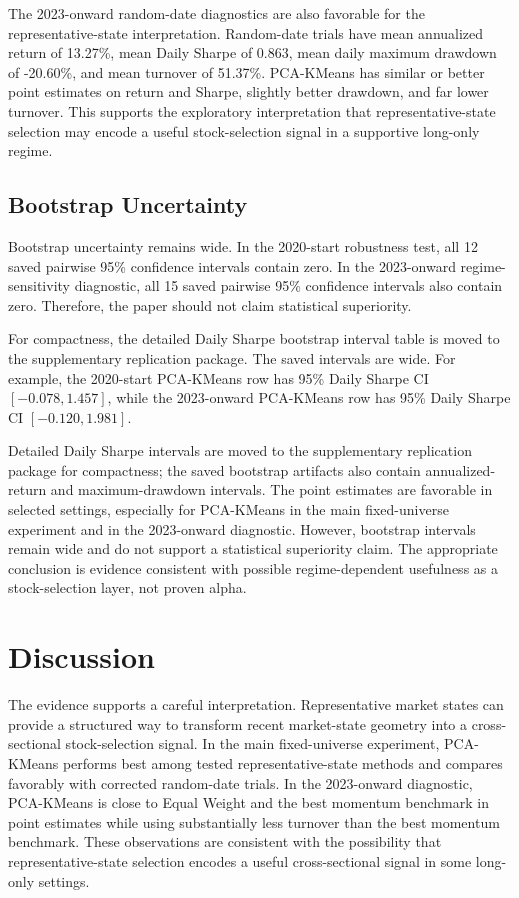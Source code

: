 \documentclass[runningheads]{llncs}
\begin{document}
The 2023-onward random-date diagnostics are also favorable for the representative-state interpretation. Random-date trials have mean annualized return of 13.27\%, mean Daily Sharpe of 0.863, mean daily maximum drawdown of -20.60\%, and mean turnover of 51.37\%. PCA-KMeans has similar or better point estimates on return and Sharpe, slightly better drawdown, and far lower turnover. This supports the exploratory interpretation that representative-state selection may encode a useful stock-selection signal in a supportive long-only regime.

\subsection{Bootstrap Uncertainty}

Bootstrap uncertainty remains wide. In the 2020-start robustness test, all 12 saved pairwise 95\% confidence intervals contain zero. In the 2023-onward regime-sensitivity diagnostic, all 15 saved pairwise 95\% confidence intervals also contain zero. Therefore, the paper should not claim statistical superiority.


For compactness, the detailed Daily Sharpe bootstrap interval table is moved to the supplementary replication package. The saved intervals are wide. For example, the 2020-start PCA-KMeans row has 95\% Daily Sharpe CI $[-0.078,1.457]$, while the 2023-onward PCA-KMeans row has 95\% Daily Sharpe CI $[-0.120,1.981]$.


Detailed Daily Sharpe intervals are moved to the supplementary replication package for compactness; the saved bootstrap artifacts also contain annualized-return and maximum-drawdown intervals. The point estimates are favorable in selected settings, especially for PCA-KMeans in the main fixed-universe experiment and in the 2023-onward diagnostic. However, bootstrap intervals remain wide and do not support a statistical superiority claim. The appropriate conclusion is evidence consistent with possible regime-dependent usefulness as a stock-selection layer, not proven alpha.

\section{Discussion}

The evidence supports a careful interpretation. Representative market states can provide a structured way to transform recent market-state geometry into a cross-sectional stock-selection signal. In the main fixed-universe experiment, PCA-KMeans performs best among tested representative-state methods and compares favorably with corrected random-date trials. In the 2023-onward diagnostic, PCA-KMeans is close to Equal Weight and the best momentum benchmark in point estimates while using substantially less turnover than the best momentum benchmark. These observations are consistent with the possibility that representative-state selection encodes a useful cross-sectional signal in some long-only settings.
\end{document}
